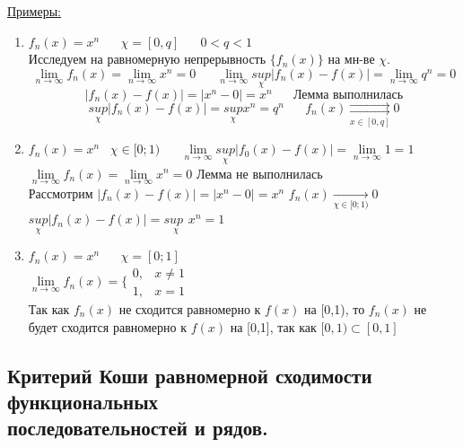 \documentclass[12pt]{article}
\let\oldlim\lim
\renewcommand{\lim}{\oldlim\limits}
\begin{document}
  \underline{Примеры:}
  \begin{enumerate}
    \item $f_n(x)=x^n \hspace{20pt} \chi = [0,q] \hspace{20pt} 0<q<1$\\
    Исследуем на равномерную непрерывность $\{f_n(x)\}$ на мн-ве $\chi$.\\
    \[\lim_{n \to \infty} f_n(x)= \lim_{n \to \infty} x^n =0 \hspace{20pt} \lim_{n \to \infty} \underset{\chi}{sup} |f_n(x)-f(x)|=
    \lim_{n \to \infty} q^n =0\]
    \[|f_n(x) -f(x)|=|x^n-0|=x^n \hspace{20pt} \text{Лемма выполнилась}\]
    \[\underset{\chi}{sup} |f_n(x)-f(x)|=\underset{\chi}{sup}x^n=q^n \hspace{20pt} f_n(x) \underset{x \in [0,q]}{\rightrightarrows} 0\]
    \item $f_n(x)=x^n \hspace{10pt} \chi \in [0;1) \hspace{20pt} \lim_{n \to \infty} \underset{\chi}{sup}|f_0(x)-f(x)|=\lim_{n \to \infty} 1 =1$
    \\ $\lim_{n \to \infty} f_n(x)=\lim_{n \to \infty}x^n=0$ \hspace{20pt} Лемма не выполнилась\\
    Рассмотрим $|f_n(x)-f(x)|=|x^n-0|=x^n$ \hspace{20pt} $f_n(x)\underset{\chi \in [0;1)}{\rightarrow} 0$\\
    $\underset{\chi}{sup} |f_n(x)-f(x)|=\underset{\chi}{sup \hspace{5pt}}x^n=1$
    \item $f_n(x)=x^n \hspace{20pt} \chi=[0;1]$\\
    $\lim_{n \to \infty} f_n(x) = \Bigg\{ 
      \begin{matrix}
        0, & x \not = 1\\
        1, & x = 1
      \end{matrix}$\\
      Так как $f_n(x)$ не сходится равномерно к $f(x)$ на [0,1), то $f_n(x)$ не будет сходится равномерно
      к $f(x)$ на [0,1], так как $[0,1) \subset [0,1]$
  \end{enumerate}

  \subsection{Критерий Коши равномерной сходимости функциональных \\ последовательностей и рядов.}
\end{document}
